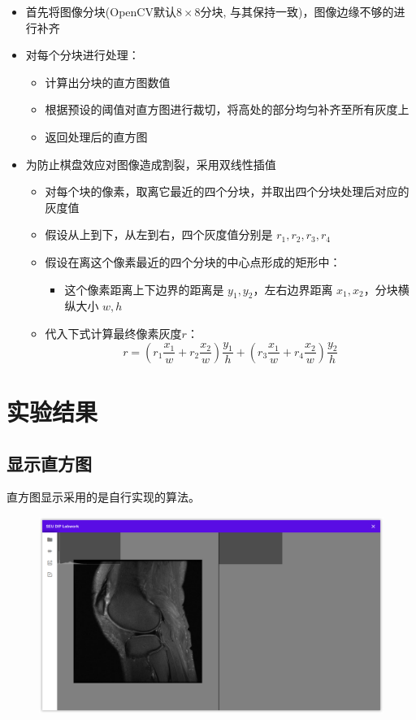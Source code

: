 \documentclass{article}
\begin{document}
\begin{itemize}
    \item 首先将图像分块(OpenCV默认$8\times 8$分块, 与其保持一致)，图像边缘不够的进行补齐
    \item 对每个分块进行处理：
    \begin{itemize}
        \item 计算出分块的直方图数值
        \item 根据预设的阈值对直方图进行裁切，将高处的部分均匀补齐至所有灰度上
        \item 返回处理后的直方图
    \end{itemize}
    \item 为防止棋盘效应对图像造成割裂，采用双线性插值
    \begin{itemize}
        \item 对每个块的像素，取离它最近的四个分块，并取出四个分块处理后对应的灰度值
        \item 假设从上到下，从左到右，四个灰度值分别是 $r_1, r_2, r_3, r_4$
        \item 假设在离这个像素最近的四个分块的中心点形成的矩形中：
        \begin{itemize}
            \item 这个像素距离上下边界的距离是 $y_1, y_2$，左右边界距离 $x_1, x_2$，分块横纵大小 $w, h$
        \end{itemize}
        \item 代入下式计算最终像素灰度$r$：$$r = (r_1 \frac{x_1}{w} + r_2 \frac{x_2}{w})\frac{y_1}{h} + (r_3 \frac{x_1}{w} + r_4 \frac{x_2}{w})\frac{y_2}{h}$$
    \end{itemize}
\end{itemize}

\section{实验结果}

\subsection{显示直方图}

直方图显示采用的是自行实现的算法。

\begin{figure}[H]
    \includegraphics[width=\textwidth]{img/histo_disp.png}
\end{figure}
\end{document}
